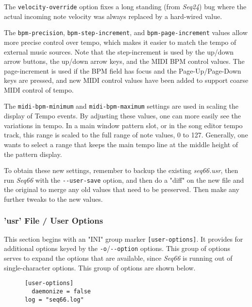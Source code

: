    The \texttt{velocity-override} option fixes a long standing (from
   \textsl{Seq24}) bug where the actual incoming note velocity was always
   replaced by a hard-wired value.

   The \texttt{bpm-precision}, \texttt{bpm-step-increment}, and
   \texttt{bpm-page-increment} values allow more precise control over tempo,
   which makes it easier to match the tempo of external music sources.  Note
   that the step-increment is used by the up/down arrow buttons, the up/down
   arrow keys, and the MIDI BPM control values.  The page-increment is used
   if the BPM field has focus and the Page-Up/Page-Down keys are pressed,
   and new MIDI control values have been added to support coarse MIDI
   control of tempo.

   The \texttt{midi-bpm-minimum} and \texttt{midi-bpm-maximum} settings
   are used in scaling the display of Tempo events.
   By adjusting these values, one can more easily see the variations in
   tempo.  In a main window pattern slot, or in the song editor tempo track,
   this range is scaled to the full range of note values, 0 to 127.
   Generally, one wants to select a range that keeps the main tempo line at
   the middle height of the pattern display.

   To obtain these new settings, remember to backup the existing
   \textsl{seq66.usr}, then run \textsl{Seq66} with the
   \texttt{-{}-user-save} option, and then do a "diff" on the new file and the
   original to merge any old values that need to be preserved.  Then make any
   further tweaks to the new values.

\subsubsection{'usr' File / User Options}
\label{subsubsec:usr_file_user_options}

   This section begins with an
   "INI" group marker \texttt{[user-options]}.
   It provides for additional options keyed by the
   \texttt{-o}/\texttt{-{}-option} options.
   This group of options serves to expand the options that are available, since
   \textsl{Seq66} is running out of single-character options.
   This group of options are shown below.

   \begin{verbatim}
      [user-options]
		daemonize = false
      log = "seq66.log"
   \end{verbatim}

